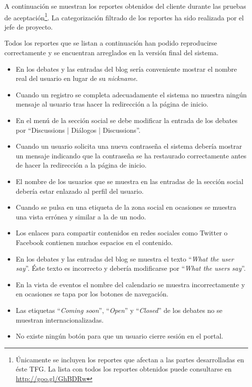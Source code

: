 A continuación se muestran los reportes obtenidos del cliente durante las pruebas de aceptación\footnote{Únicamente se incluyen los reportes que afectan a las partes desarrolladas en éste TFG.  La lista con todos los reportes obtenidos puede consultarse en \url{http://goo.gl/GhBDRw}}.  La categorización filtrado de los reportes ha sido realizada por el jefe de proyecto.

Todos los reportes que se listan a continuación han podido reproducirse correctamente y se encuentran arreglados en la versión final del sistema.
\begin{itemize}
	\item En los debates y las entradas del blog sería conveniente mostrar el nombre real del usuario en lugar de su \textit{nickname}.
	\item Cuando un registro se completa adecuadamente el sistema no muestra ningún mensaje al usuario tras hacer la redirección a la página de inicio.
	\item En el menú de la sección social se debe modificar la entrada de los debates por ``Discussions | Diálogos | Discussions''.
	\item Cuando un usuario solicita una nueva contraseña el sistema debería mostrar un mensaje indicando que la contraseña se ha restaurado correctamente antes de hacer la redirección a la página de inicio.
	\item El nombre de los usuarios que se muestra en las entradas de la sección social debería estar enlazado al perfil del usuario.
	\item Cuando se pulsa en una etiqueta de la zona social en ocasiones se muestra una vista errónea y similar a la de un nodo.
	\item Los enlaces para compartir contenidos en redes sociales como Twitter o Facebook contienen muchos espacios en el contenido.
	\item En los debates y las entradas del blog se muestra el texto ``\textit{What the user say}''.  Éste texto es incorrecto y debería modificarse por ``\textit{What the users say}''.
	\item En la vista de eventos el nombre del calendario se muestra incorrectamente y en ocasiones se tapa por los botones de navegación.
	\item Las etiquetas ``\textit{Coming soon}'', ``\textit{Open}'' y ``\textit{Closed}'' de los debates no se muestran internacionalizadas.
	\item No existe ningún botón para que un usuario cierre sesión en el portal.
\end{itemize}
